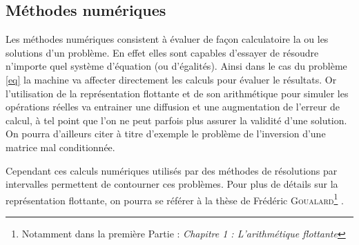 \subsection{Méthodes numériques}
Les méthodes numériques consistent à évaluer de façon calculatoire la ou les solutions d'un problème. En effet elles sont capables d'essayer de résoudre n'importe quel système d'équation (ou d'égalités). Ainsi dans le cas du problème \ref{eq} la machine va affecter directement les calculs pour évaluer le résultats. Or l'utilisation de la représentation flottante et de son arithmétique pour simuler les opérations réelles va entrainer une diffusion et une augmentation de l'erreur de calcul, à tel point que l'on ne peut  parfois plus assurer la validité d'une solution. On pourra d'ailleurs citer à titre d'exemple le problème de l'inversion d'une matrice mal conditionnée\cite{Conditionnement}. 

Cependant ces calculs numériques utilisés  par des méthodes de résolutions par intervalles permettent de contourner ces problèmes. Pour plus de détails sur la représentation flottante, on pourra se référer à la thèse de Frédéric \textsc{Goualard}\footnote{Notamment dans la première Partie : \emph{Chapitre 1 : L’arithmétique flottante}} \cite{Goualard}.

